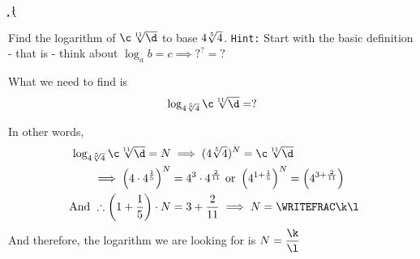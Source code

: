 

\POWER\vbone\vbthree\c
\POWER\vbone\vbfour\d
{}\vbtwo\m\n
\FRACADD{}\vbfour\vbfive\p\q
\FRACDIV\p\q\m\n\k\l
  
\question[4] Find the logarithm of $\c\sqrt[\vbfive]{\d}$ to base $4\sqrt[5]{4}$. 
\texttt{Hint:} Start with the basic definition - that is - think about $\log_a b = c\implies ?^?=?$

\watchout

\begin{solution}[\halfpage]
  What we need to find is
  \[ \log_{\vbone\sqrt[\vbtwo]{\vbone}} \c\sqrt[\vbfive]{\d} = ?\]
  
  In other words,
  \begin{align}
    \log_{\vbone\sqrt[\vbtwo]{\vbone}} \c\sqrt[\vbfive]{\d} = N &\implies 
    (\vbone\sqrt[\vbtwo]{\vbone})^N = \c\sqrt[\vbfive]{\d} \\
    \implies \left( \vbone\cdot\vbone^{\frac{1}{\vbtwo}}\right)^N
    &= \vbone^\vbthree\cdot\vbone^{\frac{\vbfour}{\vbfive}} 
    \text{ or } \left( \vbone^{1+\frac{1}{\vbtwo}}\right)^N = 
    \left( \vbone^{\vbthree + \frac{\vbfour}{\vbfive}}\right) \\
    \text{ And }\therefore \left(1 + \dfrac{1}{\vbtwo}\right)\cdot N &= 
    \vbthree + \dfrac{\vbfour}{\vbfive} \implies N = \WRITEFRAC\k\l
  \end{align}
  And therefore, the logarithm we are looking for is $N=\dfrac\k\l$
\end{solution}

